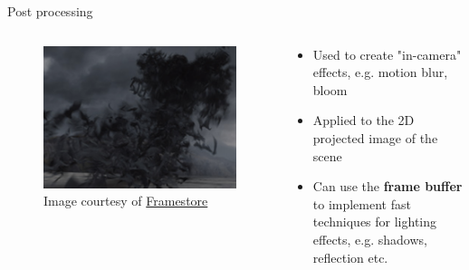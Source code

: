 \begin{frame}{Post processing}
	\begin{columns}
		\begin{column}{0.3\textwidth}
			\begin{figure}
				\includegraphics[width=\textwidth]{motion_blur}
				\caption*{Image courtesy of \href{https://www.framestore.com}{Framestore}}
			\end{figure}
		\end{column}
		\begin{column}{0.65\textwidth}
			\begin{itemize}
				\pause\item Used to create "in-camera" effects, e.g. motion blur, bloom
				\pause\item Applied to the 2D projected image of the scene
				\pause\item Can use the \textbf{frame buffer} to implement fast techniques for lighting effects, e.g. shadows, reflection etc.
			\end{itemize}
		\end{column}
	\end{columns}
\end{frame}